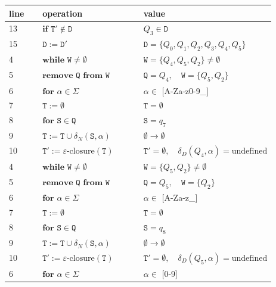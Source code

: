 \documentclass{article}
\begin{document}
\par\medskip
\par\medskip\noindent
\begin{minipage}[c]{0.59\textwidth}
\scriptsize
\setlength{\tabcolsep}{2pt}
\renewcommand{\arraystretch}{1.45}
\begin{tabular}{@{}p{0.13\linewidth}|p{0.39\linewidth}|p{}@{}}
\textbf{line} & \textbf{operation} & \textbf{value} \\
\hline
13 & \(\textbf{if }\mathtt{T}'\notin\mathtt{D}\) & \(Q_3\in\mathtt{D}\) \\
15 & \(\mathtt{D} := \mathtt{D}'\) & \(\mathtt{D}=\{Q_0,Q_1,Q_2,Q_3,Q_4,Q_5\}\) \\
4 & \(\textbf{while }\mathtt{W}\ne\emptyset\) & \(\mathtt{W}=\{Q_4,Q_5,Q_2\}\ne\emptyset\) \\
5 & \(\textbf{remove }\mathtt{Q}\textbf{ from }\mathtt{W}\) & \(\mathtt{Q}=Q_4,\quad \mathtt{W}=\{Q_5,Q_2\}\) \\
6 & \(\textbf{for }\alpha\in\Sigma\) & \(\alpha\in\) [A-Za-z0-9\_] \\
7 & \(\mathtt{T} := \emptyset\) & \(\mathtt{T}=\emptyset\) \\
8 & \(\textbf{for }\mathtt{S}\in\mathtt{Q}\) & \(\mathtt{S}=q_7\) \\
9 & \(\mathtt{T} := \mathtt{T}\cup\delta_N(\mathtt{S},\alpha)\) & \(\emptyset\to\emptyset\) \\
10 & \(\mathtt{T}' := \varepsilon\mbox{-closure}(\mathtt{T})\) & \(\mathtt{T}'=\emptyset,\quad\delta_D(Q_4,\alpha)=\text{undefined}\) \\
4 & \(\textbf{while }\mathtt{W}\ne\emptyset\) & \(\mathtt{W}=\{Q_5,Q_2\}\ne\emptyset\) \\
5 & \(\textbf{remove }\mathtt{Q}\textbf{ from }\mathtt{W}\) & \(\mathtt{Q}=Q_5,\quad \mathtt{W}=\{Q_2\}\) \\
6 & \(\textbf{for }\alpha\in\Sigma\) & \(\alpha\in\) [A-Za-z\_] \\
7 & \(\mathtt{T} := \emptyset\) & \(\mathtt{T}=\emptyset\) \\
8 & \(\textbf{for }\mathtt{S}\in\mathtt{Q}\) & \(\mathtt{S}=q_8\) \\
9 & \(\mathtt{T} := \mathtt{T}\cup\delta_N(\mathtt{S},\alpha)\) & \(\emptyset\to\emptyset\) \\
10 & \(\mathtt{T}' := \varepsilon\mbox{-closure}(\mathtt{T})\) & \(\mathtt{T}'=\emptyset,\quad\delta_D(Q_5,\alpha)=\text{undefined}\) \\
6 & \(\textbf{for }\alpha\in\Sigma\) & \(\alpha\in\) [0-9] \\

\end{tabular}
\end{minipage}
\end{document}
